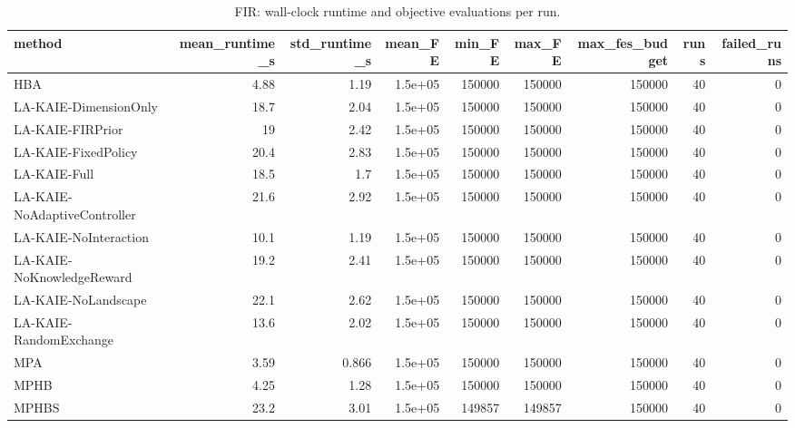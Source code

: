 \begin{table}[t]
\centering
\scriptsize
\caption{FIR: wall-clock runtime and objective evaluations per run.}
\label{tab:fir_runtime}
\begin{tabular}{lrrrrrrrr}
\toprule
method & mean\_runtime\_s & std\_runtime\_s & mean\_FE & min\_FE & max\_FE & max\_fes\_budget & runs & failed\_runs \\
\midrule
HBA & 4.88 & 1.19 & 1.5e+05 & 150000 & 150000 & 150000 & 40 & 0 \\
LA-KAIE-DimensionOnly & 18.7 & 2.04 & 1.5e+05 & 150000 & 150000 & 150000 & 40 & 0 \\
LA-KAIE-FIRPrior & 19 & 2.42 & 1.5e+05 & 150000 & 150000 & 150000 & 40 & 0 \\
LA-KAIE-FixedPolicy & 20.4 & 2.83 & 1.5e+05 & 150000 & 150000 & 150000 & 40 & 0 \\
LA-KAIE-Full & 18.5 & 1.7 & 1.5e+05 & 150000 & 150000 & 150000 & 40 & 0 \\
LA-KAIE-NoAdaptiveController & 21.6 & 2.92 & 1.5e+05 & 150000 & 150000 & 150000 & 40 & 0 \\
LA-KAIE-NoInteraction & 10.1 & 1.19 & 1.5e+05 & 150000 & 150000 & 150000 & 40 & 0 \\
LA-KAIE-NoKnowledgeReward & 19.2 & 2.41 & 1.5e+05 & 150000 & 150000 & 150000 & 40 & 0 \\
LA-KAIE-NoLandscape & 22.1 & 2.62 & 1.5e+05 & 150000 & 150000 & 150000 & 40 & 0 \\
LA-KAIE-RandomExchange & 13.6 & 2.02 & 1.5e+05 & 150000 & 150000 & 150000 & 40 & 0 \\
MPA & 3.59 & 0.866 & 1.5e+05 & 150000 & 150000 & 150000 & 40 & 0 \\
MPHB & 4.25 & 1.28 & 1.5e+05 & 150000 & 150000 & 150000 & 40 & 0 \\
MPHBS & 23.2 & 3.01 & 1.5e+05 & 149857 & 149857 & 150000 & 40 & 0 \\
\bottomrule
\end{tabular}
\end{table}
